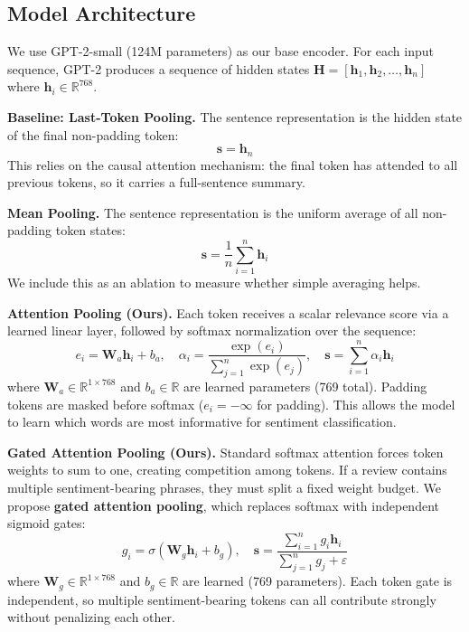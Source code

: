 \documentclass[9pt,twocolumn,twoside,lineno]{gsag3jnl}
\begin{document}
\subsection{Model Architecture}

We use GPT-2-small (124M parameters) as our base encoder. For each input sequence, GPT-2 produces a sequence of hidden states $\mathbf{H} = [\mathbf{h}_1, \mathbf{h}_2, \ldots, \mathbf{h}_n]$ where $\mathbf{h}_i \in \mathbb{R}^{768}$.

\textbf{Baseline: Last-Token Pooling.} The sentence representation is the hidden state of the final non-padding token:
\begin{equation}
\mathbf{s} = \mathbf{h}_{n}
\end{equation}
This relies on the causal attention mechanism: the final token has attended to all previous tokens, so it carries a full-sentence summary.

\textbf{Mean Pooling.} The sentence representation is the uniform average of all non-padding token states:
\begin{equation}
\mathbf{s} = \frac{1}{n}\sum_{i=1}^{n} \mathbf{h}_i
\end{equation}
We include this as an ablation to measure whether simple averaging helps.

\textbf{Attention Pooling (Ours).} Each token receives a scalar relevance score via a learned linear layer, followed by softmax normalization over the sequence:
\begin{equation}
e_i = \mathbf{W}_a \mathbf{h}_i + b_a, \quad \alpha_i = \frac{\exp(e_i)}{\sum_{j=1}^{n} \exp(e_j)}, \quad \mathbf{s} = \sum_{i=1}^{n} \alpha_i \mathbf{h}_i
\end{equation}
where $\mathbf{W}_a \in \mathbb{R}^{1 \times 768}$ and $b_a \in \mathbb{R}$ are learned parameters (769 total). Padding tokens are masked before softmax ($e_i = -\infty$ for padding). This allows the model to learn which words are most informative for sentiment classification.

\textbf{Gated Attention Pooling (Ours).} Standard softmax attention forces token weights to sum to one, creating competition among tokens. If a review contains multiple sentiment-bearing phrases, they must split a fixed weight budget. We propose \textbf{gated attention pooling}, which replaces softmax with independent sigmoid gates:
\begin{equation}
g_i = \sigma(\mathbf{W}_g \mathbf{h}_i + b_g), \quad
\mathbf{s} = \frac{\sum_{i=1}^{n} g_i \mathbf{h}_i}{\sum_{j=1}^{n} g_j + \varepsilon}
\end{equation}
where $\mathbf{W}_g \in \mathbb{R}^{1 \times 768}$ and $b_g \in \mathbb{R}$ are learned (769 parameters). Each token gate is independent, so multiple sentiment-bearing tokens can all contribute strongly without penalizing each other.
\end{document}
